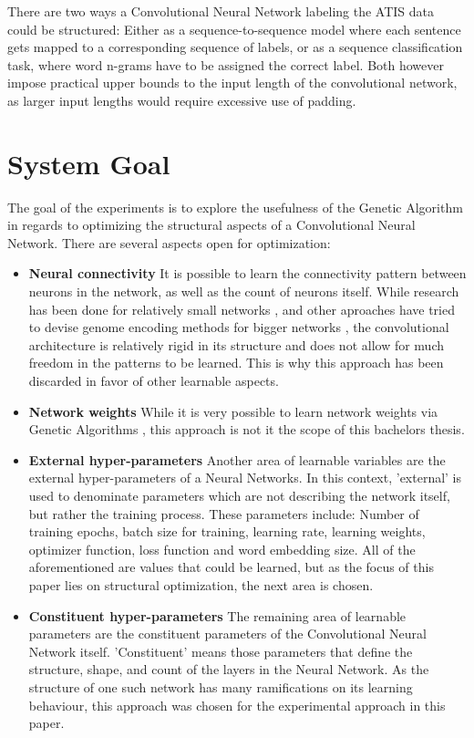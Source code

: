 \documentclass[11pt,a4paper,twoside,openright]{scrbook}
\begin{document}
There are two ways a Convolutional Neural Network labeling the ATIS data could be structured:
Either as a sequence-to-sequence model where each sentence gets mapped to a corresponding sequence of labels, or as a sequence classification task, where word n-grams have to be assigned the correct label. Both however impose practical upper bounds to the input length of the convolutional network, as larger input lengths would require excessive use of padding.

\section{System Goal}
The goal of the experiments is to explore the usefulness of the Genetic Algorithm in regards to optimizing the structural aspects of a Convolutional Neural Network. There are several aspects open for optimization:

\begin{itemize}
  \item{\textbf{Neural connectivity}} It is possible to learn the connectivity pattern between neurons in the network, as well as the count of neurons itself. While research has been done for relatively small networks \cite{Miller89,Kitano90}, and other aproaches have tried to devise genome encoding methods for bigger networks \cite{Mattiussi07}, the convolutional architecture is relatively rigid in its structure and does not allow for much freedom in the patterns to be learned. This is why this approach has been discarded in favor of other learnable aspects.
  \item{\textbf{Network weights}} While it is very possible to learn network weights via Genetic Algorithms \cite{Montana89}, this approach is not it the scope of this bachelors thesis.
  \item{\textbf{External hyper-parameters}} Another area of learnable variables are the external hyper-parameters of a Neural Networks. In this context, 'external' is used to denominate parameters which are not describing the network itself, but rather the training process. These parameters include: Number of training epochs, batch size for training, learning rate, learning weights, optimizer function, loss function and word embedding size. All of the aforementioned are values that could be learned, but as the focus of this paper lies on structural optimization, the next area is chosen.
  \item{\textbf{Constituent hyper-parameters}} The remaining area of learnable parameters are the constituent parameters of the Convolutional Neural Network itself. 'Constituent' means those parameters that define the structure, shape, and count of the layers in the Neural Network. As the structure of one such network has many ramifications on its learning behaviour, this approach was chosen for the experimental approach in this paper.
\end{itemize}
\end{document}

